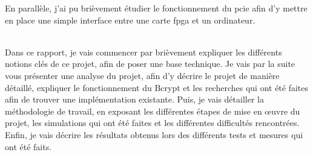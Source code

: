 En parallèle, j'ai pu brièvement étudier le fonctionnement du \gls{pcie} afin d'y mettre en place une simple interface entre une carte \gls{fpga} et un ordinateur.\\\


Dans ce rapport, je vais commencer par brièvement expliquer les différents notions clés de ce projet, afin de poser une base technique. 
Je vais par la suite vous présenter une analyse du projet, afin d'y décrire le projet de manière détaillé, expliquer le fonctionnement du Bcrypt et les recherches qui ont été faites afin de trouver une implémentation existante. 
Puis, je vais détailler la méthodologie de travail, en exposant les différentes étapes de mise en œuvre du projet, les simulations qui ont été faites et les différentes difficultés rencontrées. 
Enfin, je vais décrire les résultats obtenus lors des différents tests et mesures qui ont été faits.
